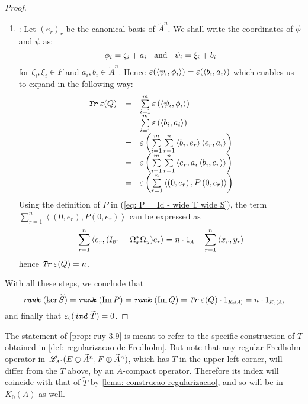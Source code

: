 \begin{proposicao}
\begin{proof}
\begin{enumerate}[label=\ensuremath{(\roman*)}]
    \item {}: Let $(e_r)_{r}$ be the canonical basis of $\widetilde{A}^n$. We shall write the coordinates of $\phi$ and $\psi$ as: 
        \begin{equation*}
            \phi_i = \zeta_i + a_i \hspace{0.25cm}\operatorname{and}\hspace{0.25cm} \psi_i = \xi_i + b_i
        \end{equation*}
        for $\zeta_i, \xi_i \in F$ and $a_i, b_i \in \widetilde{A}^n$. Hence $\operatorname{{\varepsilon}}(\langle {\psi_i},{\phi_i}\rangle) = \operatorname{{\varepsilon}}(\langle {b_i},{a_i}\rangle)$ which enables us to expand in the following way:
        \begin{equation*}
            \begin{array}{rcl}
                \texttt{\textit{Tr}}\operatorname{{\varepsilon}}(Q) &=& \sum\limits_{i=1}^m \operatorname{{\varepsilon}}\left(\left\langle \psi_i, \phi_i\right\rangle\right) \\ &=& \sum\limits_{i=1}^m \operatorname{{\varepsilon}}\left(\left\langle b_i, a_i\right\rangle\right) \\
            &=& \operatorname{{\varepsilon}}\left(\sum\limits_{i=1}^m \sum\limits_{r=1}^n\left\langle b_i, e_r\right\rangle\left\langle e_r, a_i\right\rangle\right) \\
            &=& \operatorname{{\varepsilon}}\left(\sum\limits_{i=1}^m \sum\limits_{r=1}^n\left\langle e_r, a_i\left\langle b_i, e_r\right\rangle\right\rangle\right)\\
            &=&\operatorname{{\varepsilon}}\left(\sum\limits_{r=1}^n\left\langle\left(0, e_r\right), P\left(0, e_r\right)\right\rangle\right) 
            \end{array}
        \end{equation*}
        Using the definition of $P$ in (\ref{eq: P = Id - wide T wide S}), the term $\sum_{r=1}^n\left\langle\left(0, e_r\right), P\left(0, e_r\right)\right\rangle$ can be expressed as
$$
        \sum_{r=1}^n\left\langle e_r,(\sub\Id{B^n}-\Omega_x^* \Omega_y) e_r\right\rangle=n\cdot \sub 1A-\sum_{r=1}^n\left\langle x_r, y_r\right\rangle
        $$
        hence $\texttt{\textit{Tr}}\operatorname{{\varepsilon}}(Q) = n$.
    \end{enumerate}
    With all these steps, we conclude that 
    \begin{equation*}
        \rank(\ker \widetilde S) = \rank(\Im P) = \rank(\Im Q) = \texttt{\textit{Tr}}\ep(Q)\cdot \sub{1}{K_0(A)} = n\cdot \sub{1}{K_0(A)}
    \end{equation*}
    and finally that $\sub\ep{0}(\ind \widetilde T) = 0$.
    \end{proof}
\end{proposicao}

The statement of \ref{prop: ruy 3.9} is meant to refer to the specific construction of $\widetilde{T}$ obtained in \ref{def: regularizacao de Fredholm}. But note that any regular Fredholm operator in $\sub\adj{{A}^u}(E \oplus {\widetilde{A}}^n, F \oplus {\widetilde{A}}^n)$, which has $T$ in the upper left corner, will differ from the $\widetilde{T}$ above, by an ${\widetilde{A}}$-compact operator. Therefore its index will coincide with that of $\widetilde{T}$ by \ref{lema: construcao regularizacao}, and so will be in $K_0(A)$ as well.

